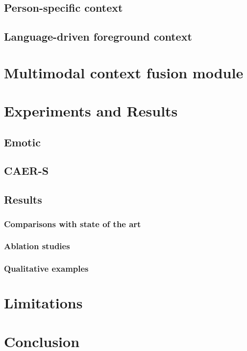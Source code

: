 \subsection{Person-specific context}
\subsection{Language-driven foreground context}
\section{Multimodal context fusion module}
\section{Experiments and Results}
\subsection{Emotic}
\subsection{CAER-S}
\subsection{Results}
\subsubsection{Comparisons with state of the art}
\subsubsection{Ablation studies}
\subsubsection{Qualitative examples}
\section{Limitations}
\section{Conclusion}


